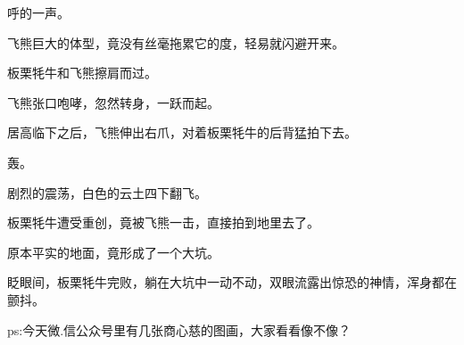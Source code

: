 \begin{this_body}
呼的一声。

飞熊巨大的体型，竟没有丝毫拖累它的度，轻易就闪避开来。

板栗牦牛和飞熊擦肩而过。

飞熊张口咆哮，忽然转身，一跃而起。

居高临下之后，飞熊伸出右爪，对着板栗牦牛的后背猛拍下去。

轰。

剧烈的震荡，白色的云土四下翻飞。

板栗牦牛遭受重创，竟被飞熊一击，直接拍到地里去了。

原本平实的地面，竟形成了一个大坑。

眨眼间，板栗牦牛完败，躺在大坑中一动不动，双眼流露出惊恐的神情，浑身都在颤抖。

ps:今天微.信公众号里有几张商心慈的图画，大家看看像不像？

\end{this_body}

